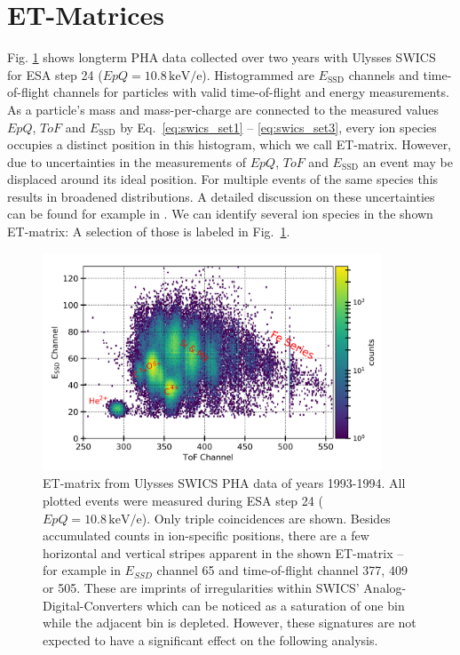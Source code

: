 \section{ET-Matrices}
\label{sec:etmatrices}
Fig. \ref{fig:et_matrix} shows longterm PHA data collected over two years with Ulysses SWICS for ESA step 24 ($EpQ = 10.8\,\mathrm{keV/e}$). Histogrammed are $E_{\mathrm{SSD}}$ channels and time-of-flight channels for particles with valid time-of-flight and energy measurements. As a particle's mass and mass-per-charge are connected to the measured values $EpQ$, $ToF$ and $E_{\mathrm{SSD}}$ by Eq.~\ref{eq:swics_set1} --  \ref{eq:swics_set3}, every ion species occupies a distinct position in this histogram, which we call ET-matrix. 
However, due to uncertainties in the measurements of $EpQ$, $ToF$ and $E_{\mathrm{SSD}}$ an event may be displaced around its ideal position. 
For multiple events of the same species this results in broadened distributions. A detailed discussion on these uncertainties can be found for example in \citet{lars-phd}.
We can identify several ion species in the shown ET-matrix: A selection of those is labeled in Fig.~\ref{fig:et_matrix}.



\begin{figure}[h]
	\includegraphics[width=0.9\textwidth]{Figures/et_matrix_labels.png}
	\centering
	\caption{ET-matrix from Ulysses SWICS PHA data of years 1993-1994. All plotted events were measured during ESA step 24 ($EpQ = 10.8\,\mathrm{keV/e}$). Only triple coincidences are shown. Besides accumulated counts in ion-specific positions, there are a few horizontal and vertical stripes apparent in the shown ET-matrix -- for example in $E_{SSD}$ channel 65 and time-of-flight channel 377, 409 or 505. These are imprints of irregularities within SWICS' Analog-Digital-Converters which can be noticed as a saturation of one bin while the adjacent bin is depleted. However, these signatures are not expected to have a significant effect on the following analysis.}
	\label{fig:et_matrix}
\end{figure}


